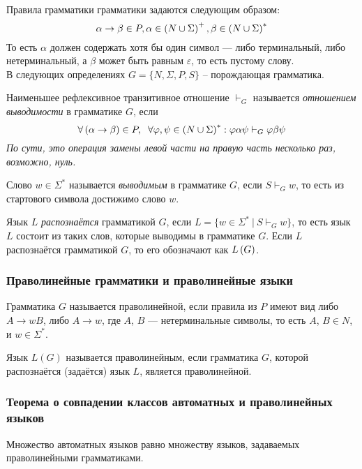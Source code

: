 Правила грамматики грамматики задаются следующим образом:
$$
    \alpha \rightarrow \beta \in P, 
    \alpha \in \left({N \cup \Sigma}\right)^{+},
    \beta \in \left({N \cup \Sigma}\right)^{*}
$$
То есть $\alpha$ должен содержать хотя бы один символ — либо терминальный, либо нетерминальный, а $\beta$ может быть равным $\varepsilon$, то есть пустому слову. \\

В следующих определениях $G = \{N, \Sigma, P, S\}$ -- порождающая грамматика.

\Def
Наименьшее рефлексивное транзитивное отношение $\vdash_{G}$ 
называется \textit{отношением выводимости} в грамматике $G$, если 
$$
    \forall \left({\alpha \rightarrow \beta}\right) \in P, \;\;
    \forall \varphi, \psi \in \left({N \cup \Sigma}\right)^{*}:
    \varphi \alpha \psi \vdash_{G} \varphi \beta \psi
$$
\textit{По сути, это операция замены левой части на правую часть несколько раз, возможно, нуль.}

\Def
Слово $w \in \Sigma^{*}$ называется \textit{выводимым} в грамматике $G$,
если $S \vdash_{G} w$, то есть из стартового символа достижимо слово $w$.

\Def 
Язык $L$ \textit{распознаётся} грамматикой $G$, если $L = \{w \in \Sigma^{*}\ |\ S \vdash_{G} w\}$, то есть язык $L$ состоит из таких слов, которые выводимы в грамматике $G$. Если $L$ распознаётся грамматикой $G$, то его обозначают как $L \left({G}\right)$.

\subsubsection*{Праволинейные грамматики и праволинейные языки}

\Def Грамматика $G$ называется праволинейной, если правила из $P$ имеют вид либо $A \rightarrow wB$, либо $A \rightarrow w$, где $A$, $B$ — нетерминальные символы, то есть $A$, $B \in N$, и $w \in \Sigma^*$.

\Def Язык $L(G)$ называется праволинейным, если грамматика $G$, которой распознаётся (задаётся) язык $L$, является праволинейной.


\subsubsection*{Теорема о совпадении классов автоматных и праволинейных языков}

\Th Множество автоматных языков равно множеству языков, 
задаваемых праволинейными грамматиками.

